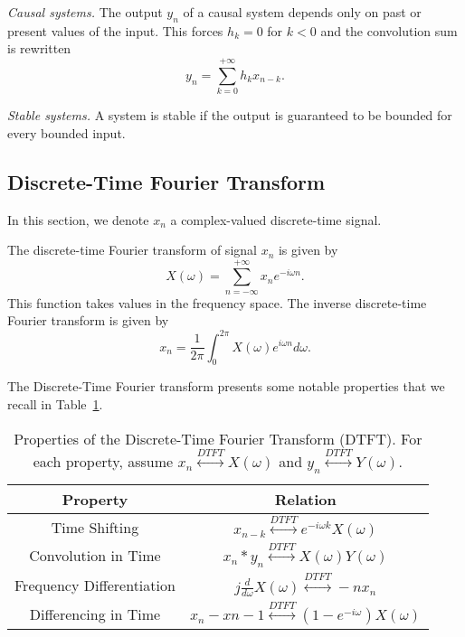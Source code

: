 \textit{Causal systems.} The output $y_n$ of a causal system depends only on past or present values of the input. This forces $h_k=0$ for $k<0$ and the convolution sum is rewritten 
\[
y_n = \sum_{k=0}^{+\infty}h_kx_{n-k}.
\]

\textit{Stable systems.} A system is stable if the output is guaranteed to be bounded for every bounded input. 



\subsection{Discrete-Time Fourier Transform}

In this section, we denote $x_n$ a complex-valued discrete-time signal.

\begin{definition}
    The discrete-time Fourier transform of signal $x_n$ is given by
    \[
    X(\omega) = \sum_{n=-\infty}^{+\infty}x_ne^{-i\omega n}.
    \]
    This function takes values in the frequency space.
    The inverse discrete-time Fourier transform is given by 
    \[
    x_n = \frac{1}{2\pi}\int_0^{2\pi}X(\omega)e^{i\omega n}d\omega.
    \]
\end{definition}

The Discrete-Time Fourier transform presents some notable properties that we recall in Table~\ref{table:dtft-properties}.

\begin{table}[h!]
\centering
\renewcommand{\arraystretch}{1.5}
\begin{tabular}{|c|c|}
\hline
\textbf{Property} & \textbf{Relation} \\ \hline
Time Shifting & 
$x_{n-k} \overset{DTFT}{\longleftrightarrow} e^{-i\omega k} X(\omega)$ \\ \hline
Convolution in Time & 
$x_n * y_n \overset{DTFT}{\longleftrightarrow} X(\omega) Y(\omega)$ \\ \hline
Frequency Differentiation & 
$j \frac{d}{d\omega} X(\omega) \overset{DTFT}{\longleftrightarrow} -n x_n$ \\ \hline
Differencing in Time & 
$x_n - x{n-1} \overset{DTFT}{\longleftrightarrow} \left(1 - e^{-i\omega}\right) X(\omega)$ \\ \hline
\end{tabular}
\caption{Properties of the Discrete-Time Fourier Transform (DTFT). For each property, assume $x_n\overset{DTFT}{\longleftrightarrow} X(\omega)$ and $y_n\overset{DTFT}{\longleftrightarrow} Y(\omega)$.}
\label{table:dtft-properties}
\end{table}

